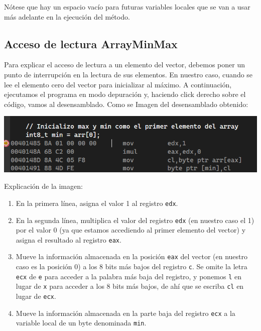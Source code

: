 \documentclass[11pt,a4paper]{article}
\begin{document}
Nótese que hay un espacio vacío para futuras variables locales que se van a usar más adelante en la ejecución del método.


\subsection{Acceso de lectura ArrayMinMax}
Para explicar el acceso de lectura a un elemento del vector, debemos poner un punto de interrupción en la lectura 
de sus elementos. En nuestro caso, cuando se lee el elemento cero del vector para inicializar al máximo.
 A continuación, ejecutamos el programa en modo depuración y, haciendo click derecho sobre el código, vamos al desensamblado. Como se 
 Imagen del desensamblado obtenido:
 \vspace{1ex}
 \begin{center}
  \includegraphics[width=\textwidth]{VentanaDesensamblado.png}
 \end{center}
 \vspace{1ex}
 Explicación de la imagen:
 \begin{enumerate}
  \item En la primera línea, asigna el valor 1 al registro \texttt{edx}.
  \item En la segunda línea, multiplica el valor del registro \texttt{edx} (en nuestro caso el 1) por el valor 0 (ya que estamos accediendo al primer elemento del vector) y asigna el 
  resultado al registro \texttt{eax}.
  \vspace{3ex}

  \item Mueve la información almacenada en la posición \texttt{eax} del vector (en nuestro caso es la posición 0) a los 8 bits más bajos del registro \texttt{c}. Se omite la letra \texttt{ecx} de \texttt{e} para acceder a la 
  palabra más baja del registro, y ponemos \texttt{l} en lugar de \texttt{x} para acceder a los 8 bits más bajos, de ahí que se escriba \texttt{cl} en lugar de \texttt{ecx}.
  \item Mueve la información almacenada en la parte baja del registro \texttt{ecx} a la variable local de un byte denominada \texttt{min}.
 \end{enumerate}
\end{document}
